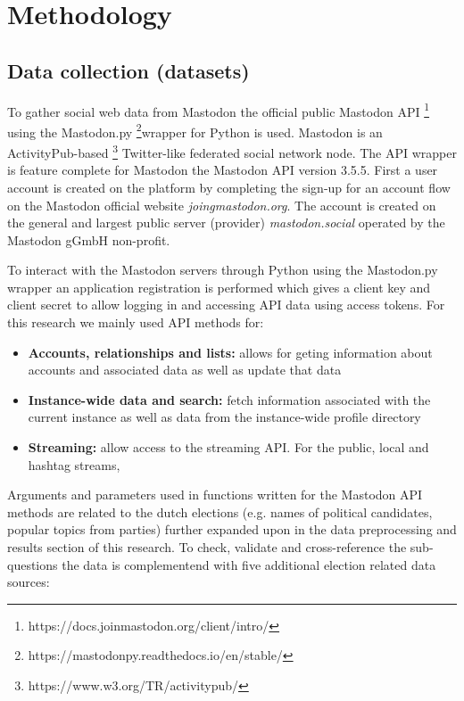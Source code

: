 \section{Methodology}

\subsection{Data collection (datasets)}

To gather social web data from Mastodon the official public Mastodon API \footnote{https://docs.joinmastodon.org/client/intro/} using the Mastodon.py \footnote{https://mastodonpy.readthedocs.io/en/stable/}wrapper for Python is used. Mastodon is an ActivityPub-based \footnote{https://www.w3.org/TR/activitypub/} Twitter-like federated social network node. The API wrapper is feature complete for Mastodon the Mastodon API version 3.5.5. First a user account is created on the platform by completing the sign-up for an account flow on the Mastodon official website \textit{joingmastodon.org}. The account is created on the general and largest public server (provider) \textit{mastodon.social} operated by the Mastodon gGmbH non-profit.

To interact with the Mastodon servers through Python using the Mastodon.py wrapper an application registration is performed which gives a client key and client secret to allow logging in and accessing API data using access tokens. For this research we mainly used API methods for:

\begin{itemize}
  \item \textbf{Accounts, relationships and lists:} allows for geting information about accounts and associated data as well as update that data
  \item \textbf{Instance-wide data and search:}  fetch information associated with the current instance as well as data from the instance-wide profile directory
  \item \textbf{Streaming:} allow access to the streaming API. For the public, local and hashtag streams,
\end{itemize}

Arguments and parameters used in functions written for the Mastodon API methods are related to the dutch elections (e.g. names of political candidates, popular topics from parties) further expanded upon in the data preprocessing and results section of this research. To check, validate and cross-reference the sub-questions the data is complementend with five additional election related data sources: 

